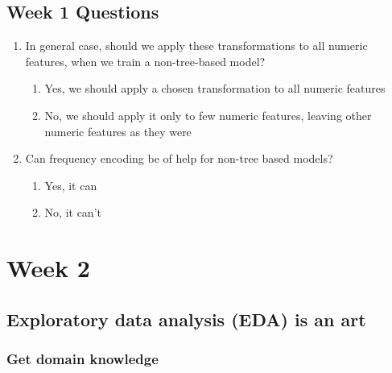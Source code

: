\documentclass[11pt, twoside]{article}   	%
\begin{document}
\subsection{Week 1 Questions }
\renewcommand{\labelenumii}{\Alph{enumii}}
\begin{enumerate}
  \item In general case, should we apply these transformations to all numeric features, when we train a non-tree-based model?
    \begin{enumerate}
      \item Yes, we should apply a chosen transformation to all numeric features
      \item No, we should apply it only to few numeric features, leaving other numeric features as they were
    \end{enumerate}
 
  \item Can frequency encoding be of help for non-tree based models?
    \begin{enumerate}
      \item Yes, it can
      \item No, it can't
    \end{enumerate}
 
  \end{enumerate}
  
\pagebreak
\section{Week 2}

\subsection{Exploratory data analysis (EDA) is an art}
\subsubsection{Get domain knowledge} 
\end{document}
